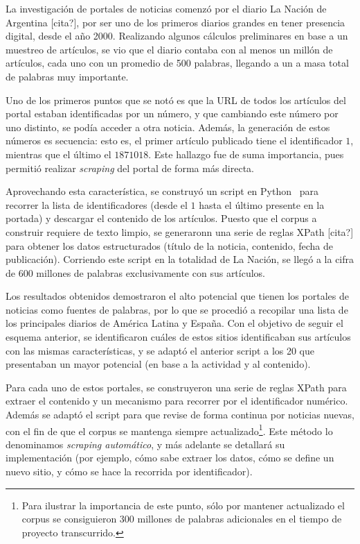 La investigación de portales de noticias comenzó por el diario La Nación de Argentina [cita?], por
ser uno de los primeros diarios grandes en tener presencia digital, desde el año 2000. Realizando
algunos cálculos preliminares en base a un muestreo de artículos, se vio que el diario contaba con
al menos un millón de artículos, cada uno con un promedio de 500 palabras, llegando a un a masa total
de palabras muy importante.

Uno de los primeros puntos que se notó es que la URL de todos los artículos del portal estaban
identificadas por un número, y que cambiando este número por uno distinto, se podía acceder a otra
noticia. Además, la generación de estos números es secuencia: esto es, el primer artículo publicado
tiene el identificador $1$, mientras que el último el $1871018$. Este hallazgo fue de suma
importancia, pues permitió realizar \textit{scraping} del portal de forma más directa.

Aprovechando esta característica, se construyó un script en Python~\cite{Python} para recorrer la lista de
identificadores (desde el $1$ hasta el último presente en la portada) y descargar el contenido de
los artículos. Puesto que el corpus a construir requiere de texto limpio, se generaronn una serie de
reglas XPath [cita?] para obtener los datos estructurados (título de la noticia, contenido, fecha de
publicación). Corriendo este script en la totalidad de La Nación, se llegó a la cifra de 600
millones de palabras exclusivamente con sus artículos.

Los resultados obtenidos demostraron el alto potencial que tienen los portales de noticias como
fuentes de palabras, por lo que se procedió a recopilar una lista de los principales diarios de
América Latina y España. Con el objetivo de seguir el esquema anterior, se identificaron cuáles de
estos sitios identificaban sus artículos con las mismas características, y se adaptó el anterior
script a los 20 que presentaban un mayor potencial (en base a la actividad y al contenido).

Para cada uno de estos portales, se construyeron una serie de reglas XPath para extraer el contenido
y un mecanismo para recorrer por el identificador numérico. Además se adaptó el script para que
revise de forma continua por noticias nuevas, con el fin de que el corpus se mantenga siempre
actualizado\footnote{Para ilustrar la importancia de este punto, sólo por mantener actualizado el
corpus se consiguieron 300 millones de palabras adicionales en el tiempo de proyecto
transcurrido.}. Este método lo denominamos \textit{scraping automático}, y más adelante se detallará
su implementación (por ejemplo, cómo sabe extraer los datos, cómo se define un nuevo sitio, y cómo se
hace la recorrida por identificador).

